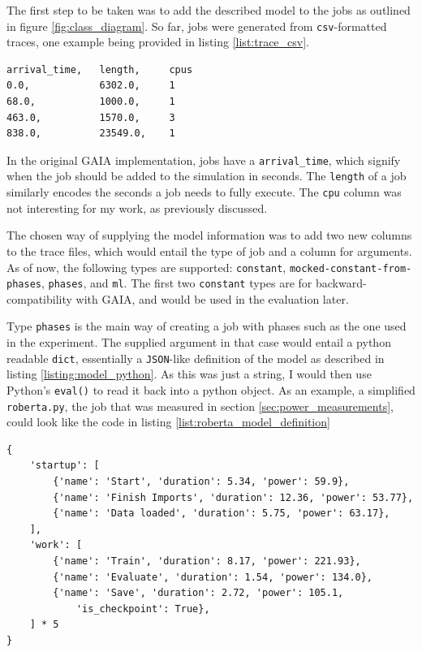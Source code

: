 The first step to be taken was to add the described model to the jobs as outlined in figure \ref{fig:class_diagram}. 
So far, jobs were generated from \verb|csv|-formatted traces, one example being provided in listing \ref{list:trace_csv}.

\begin{lstlisting}[frame=single, numbers=none, caption={Excerpt from the Alibaba-PAI trace}, label={list:trace_csv}, basicstyle=\ttfamily]
arrival_time,   length,     cpus
0.0,            6302.0,     1
68.0,           1000.0,     1
463.0,          1570.0,     3
838.0,          23549.0,    1
\end{lstlisting}

In the original GAIA implementation, jobs have a \verb|arrival_time|, which signify when the job should be added to the simulation in seconds. 
The \verb|length| of a job similarly encodes the seconds a job needs to fully execute. The \verb|cpu| column was not interesting for my work, as previously discussed.

The chosen way of supplying the model information was to add two new columns to the trace files, which would entail the type of job and a column for arguments. 
As of now, the following types are supported: \verb|constant|, \verb|mocked-constant-from-phases|, \verb|phases|, and \verb|ml|. 
The first two \verb|constant| types are for backward-compatibility with GAIA, and would be used in the evaluation later. 

Type \verb|phases| is the main way of creating a job with phases such as the one used in the experiment. The supplied argument in that case would entail a python readable \verb|dict|, essentially a \verb|JSON|-like definition of the model as described in listing \ref{listing:model_python}.
As this was just a string, I would then use Python's \verb|eval()| to read it back into a python object.
As an example, a simplified \verb|roberta.py|, the job that was measured in section \ref{sec:power_measurements}, could look like the code in listing \ref{list:roberta_model_definition}

\begin{lstlisting}[frame=single, numbers=none, caption={Simplified definition for a job similar to the experiment}, label={list:roberta_model_definition}, basicstyle=\ttfamily]
{
    'startup': [
        {'name': 'Start', 'duration': 5.34, 'power': 59.9},
        {'name': 'Finish Imports', 'duration': 12.36, 'power': 53.77},
        {'name': 'Data loaded', 'duration': 5.75, 'power': 63.17}, 
    ],
    'work': [
        {'name': 'Train', 'duration': 8.17, 'power': 221.93}, 
        {'name': 'Evaluate', 'duration': 1.54, 'power': 134.0}, 
        {'name': 'Save', 'duration': 2.72, 'power': 105.1,
            'is_checkpoint': True}, 
    ] * 5
}
\end{lstlisting}

